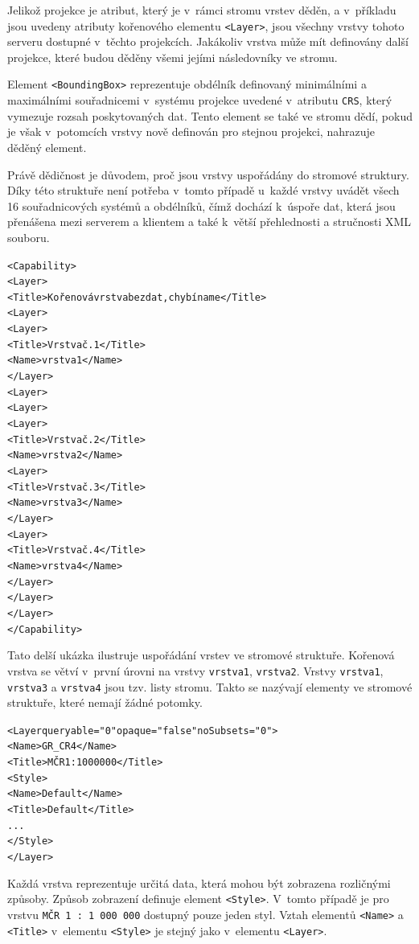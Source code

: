 \documentclass[a4paper,12pt]{article}
\begin{document}
Jelikož projekce je atribut, který je v~rámci stromu vrstev děděn, a
v~příkladu jsou uvedeny atributy kořenového elementu {\tt <Layer>}, jsou
všechny vrstvy tohoto serveru dostupné v~těchto projekcích.  Jakákoliv
vrstva může mít definovány další projekce, které budou
děděny všemi jejími následovníky ve stromu.

Element {\tt <BoundingBox>} reprezentuje obdélník definovaný minimálními a
maximálními souřadnicemi v~systému projekce uvedené v~atributu {\tt CRS},
který vymezuje rozsah poskytovaných dat.  Tento element se také ve
stromu dědí, pokud je však v~potomcích vrstvy nově definován pro
stejnou projekci, nahrazuje děděný element.

Právě dědičnost je důvodem, proč jsou vrstvy uspořádány do stromové
struktury. Díky této struktuře není potřeba v~tomto případě u~každé
vrstvy uvádět všech 16 souřadnicových systémů a obdélníků, čímž
dochází k~úspoře dat, která jsou přenášena mezi serverem a klientem a
také k~větší přehlednosti a stručnosti XML souboru.

\begin{alltt}\footnotesize
<Capability>
  <Layer>
    <Title>Kořenová vrstva bez dat, chybí name</Title>
    <Layer>
      <Layer>
        <Title>Vrstva č. 1</Title>
        <Name>vrstva1</Name>
      </Layer>
    <Layer>
    <Layer>
      <Layer>
        <Title>Vrstva č. 2</Title>
        <Name>vrstva2</Name>
        <Layer>
          <Title>Vrstva č. 3</Title>
          <Name>vrstva3</Name>
        </Layer>
        <Layer>
          <Title>Vrstva č. 4</Title>
          <Name>vrstva4</Name>
        </Layer>
      </Layer>
    </Layer>
</Capability>
\end{alltt}

Tato delší ukázka ilustruje uspořádání vrstev ve stromové
struktuře. Kořenová vrstva se větví v~první úrovni na vrstvy {\tt vrstva1},
{\tt vrstva2}. Vrstvy {\tt vrstva1}, {\tt vrstva3} a {\tt vrstva4} jsou tzv. listy
stromu. Takto se nazývají elementy ve stromové struktuře, které nemají
žádné potomky.
\newpage
\begin{alltt}\footnotesize
<Layer queryable="0" opaque="false" noSubsets="0">
    <Name>GR_CR4</Name>
    <Title>MČR 1 : 1 000 000</Title>
    <Style>
        <Name>Default</Name>
        <Title>Default</Title>
          ...
    </Style>
</Layer>
\end{alltt}


Každá vrstva reprezentuje určitá data, která mohou být zobrazena
rozličnými způsoby. Způsob zobrazení definuje element {\tt <Style>}. V~tomto
případě je pro vrstvu {\tt MČR 1 : 1 000 000} dostupný pouze jeden
styl. Vztah elementů {\tt <Name>} a {\tt <Title>} v~elementu {\tt <Style>} je stejný jako
v~elementu {\tt <Layer>}.
\end{document}
